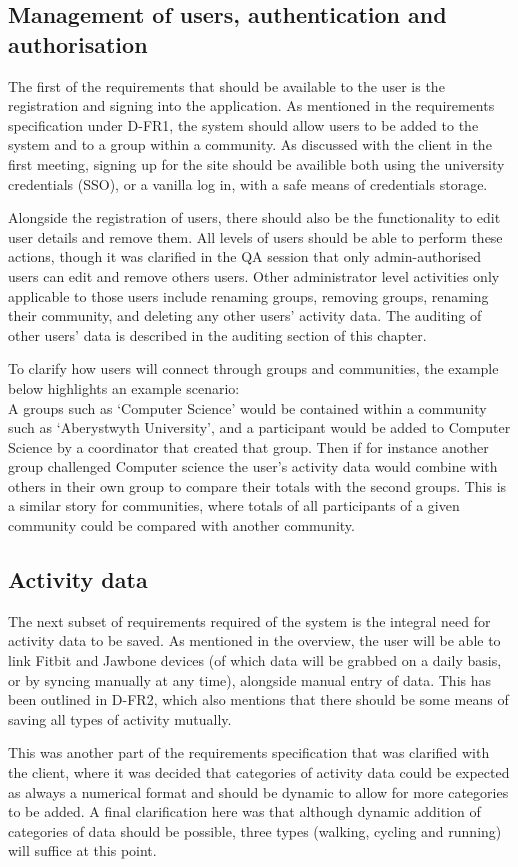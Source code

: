 \subsection{Management of users, authentication and authorisation}
The first of the requirements that should be available to the user is the registration and signing into the application. As mentioned in the requirements specification under D-FR1, the system should allow users to be added to the system and to a group within a community. As discussed with the client in the first meeting, signing up for the site should be availible both using the university credentials (SSO), or a vanilla log in, with a safe means of credentials storage. \par
Alongside the registration of users, there should also be the functionality to edit user details and remove them. All levels of users should be able to perform these actions, though it was clarified in the QA session that only admin-authorised users can edit and remove others users. Other administrator level activities only applicable to those users include renaming groups, removing groups, renaming their community, and deleting any other users' activity data. The auditing of other users' data is described in the auditing section of this chapter. \par
To clarify how users will connect through groups and communities, the example below highlights an example scenario:\\
A groups such as `Computer Science' would be contained within a community such as `Aberystwyth University', and a participant would be added to Computer Science by a coordinator that created that group. Then if for instance another group challenged Computer science the user's activity data would combine with others in their own group to compare their totals with the second groups. This is a similar story for communities, where totals of all participants of a given community could be compared with another community.
\subsection{Activity data}
The next subset of requirements required of the system is the integral need for activity data to be saved. As mentioned in the overview, the user will be able to link Fitbit and Jawbone devices (of which data will be grabbed on a daily basis, or by syncing manually at any time), alongside manual entry of data. This has been outlined in D-FR2, which also mentions that there should be some means of saving all types of activity mutually. \par
This was another part of the requirements specification that was clarified with the client, where it was decided that categories of activity data could be expected as always a numerical format and should be dynamic to allow for more categories to be added. A final clarification here was that although dynamic addition of categories of data should be possible, three types (walking, cycling and running) will suffice at this point.
